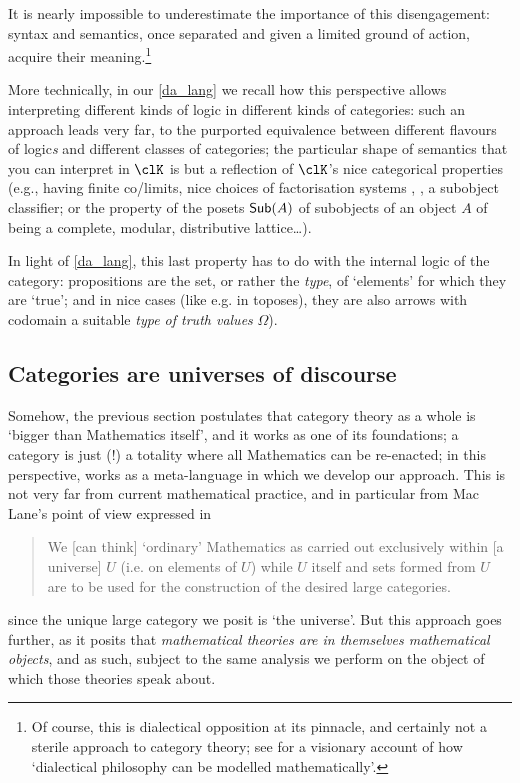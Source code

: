 It is nearly impossible to underestimate the importance of this disengagement: syntax and semantics, once separated and given a limited ground of action, acquire their meaning.\footnote{Of course, this is dialectical opposition at its pinnacle, and certainly not a sterile approach to category theory; see \cite{lawvere1996unity} for a visionary account of how `dialectical philosophy can be modelled mathematically'.}

More technically, in our \autoref{da_lang} we recall how this perspective allows interpreting different kinds of logic in different kinds of categories: such an approach leads very far, to the purported equivalence between different flavours of logic\emph{s} and different classes of categories; the particular shape of semantics that you can interpret in $\clK$ is but a reflection of $\clK$'s nice categorical properties (e.g., having finite co/limits, nice choices of factorisation systems \cite[5.5]{Bor1}, \cite{FK}, a subobject classifier; or the property of the posets $\mathsf{Sub}(A)$ of subobjects of an object $A$ of being a complete, modular, distributive lattice\dots).

In light of \autoref{da_lang}, this last property has to do with the internal logic of the category: propositions are the set, or rather the \emph{type}, of `elements' for which they are `true'; and in nice cases (like e.g. in toposes), they are also arrows with codomain a suitable \emph{type of truth values} $\Omega$).
\subsection{Categories are universes of discourse}\label{are_universes}
Somehow, the previous section postulates that category theory as a whole is `bigger than Mathematics itself', and it works as one of its foundations; a category is just (!) a totality where all Mathematics can be re-enacted; in this perspective,  works as a meta\hyp{}language in which we develop our approach. This is not very far from current mathematical practice, and in particular from Mac Lane's point of view expressed in
\begin{quote}
    We [can think] `ordinary' Mathematics as carried out exclusively within [a universe] $U$ (i.e. on elements of $U$) while $U$ itself and sets formed from $U$ are to be used for the construction of the desired large categories.\hfill \cite[I.6]{McL}
\end{quote}
since the unique large category we posit is `the universe'. But this approach goes further, as it posits that \emph{mathematical theories are in themselves mathematical objects}, and as such, subject to the same analysis we perform on the object of which those theories speak about.

